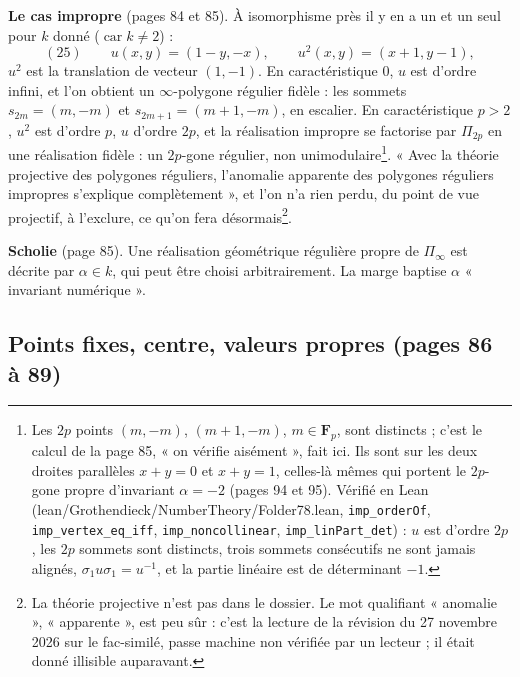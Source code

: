\documentclass[11pt,a4paper]{article}
\begin{document}
\textbf{Le cas impropre} (pages 84 et 85). À isomorphisme près il y en a un et
un seul pour $k$ donné ($\operatorname{car} k \neq 2$) :
\[
  (25) \qquad u(x, y) = (1 - y, -x), \qquad u^2(x, y) = (x + 1, y - 1) ,
\]
$u^2$ est la translation de vecteur $(1, -1)$. En caractéristique $0$, $u$ est
d'ordre infini, et l'on obtient un $\infty$-polygone régulier fidèle : les
sommets $s_{2m} = (m, -m)$ et $s_{2m+1} = (m + 1, -m)$, en escalier. En
caractéristique $p > 2$, $u^2$ est d'ordre $p$, $u$ d'ordre $2p$, et la
réalisation impropre se factorise par $\Pi_{2p}$ en une réalisation fidèle :
un $2p$-gone régulier, non unimodulaire\footnote{Les $2p$ points $(m, -m)$,
$(m+1, -m)$, $m \in \mathbf{F}_p$, sont distincts ; c'est le calcul de la page
85, « on vérifie aisément », fait ici. Ils sont sur les deux droites
parallèles $x + y = 0$ et $x + y = 1$, celles-là mêmes qui portent le
$2p$-gone propre d'invariant $\alpha = -2$ (pages 94 et 95). Vérifié en Lean
(lean/Grothendieck/NumberTheory/Folder78.lean, \texttt{imp\_orderOf},
\texttt{imp\_vertex\_eq\_iff}, \texttt{imp\_noncollinear},
\texttt{imp\_linPart\_det}) : $u$ est d'ordre $2p$, les $2p$ sommets sont
distincts, trois sommets consécutifs ne sont jamais alignés,
$\sigma_1 u \sigma_1 = u^{-1}$, et la partie linéaire est de déterminant
$-1$.}. « Avec la théorie projective des
polygones réguliers, l'anomalie apparente des polygones réguliers impropres s'explique
complètement », et l'on n'a rien perdu, du point de vue projectif, à
l'exclure, ce qu'on fera désormais\footnote{La théorie projective n'est pas
dans le dossier. Le mot qualifiant « anomalie », « apparente », est peu sûr :
c'est la lecture de la révision du 27 novembre 2026 sur le fac-similé, passe
machine non vérifiée par un lecteur ; il était donné illisible auparavant.}.

\textbf{Scholie} (page 85). Une réalisation géométrique régulière propre de
$\Pi_\infty$ est décrite par $\alpha \in k$, qui peut être choisi
arbitrairement. La marge baptise $\alpha$ « invariant numérique ».

\subsection*{Points fixes, centre, valeurs propres (pages 86 à 89)}
\end{document}
